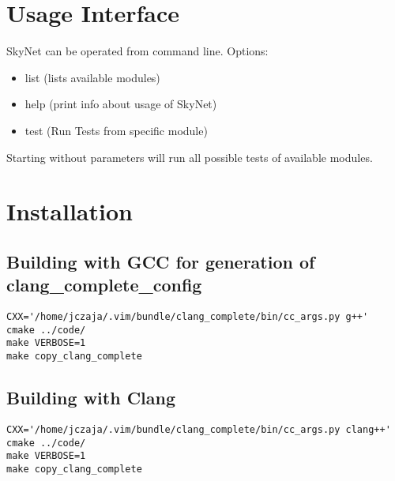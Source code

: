 \documentclass[a4paper,10pt]{article}
\begin{document}
\section{Usage Interface}
SkyNet can be operated from command line. Options:
\begin{itemize}
\item list (lists available modules)
\item help (print info about usage of SkyNet)
\item test (Run Tests from specific module)
\end{itemize}

Starting without parameters will run all possible tests of available modules.


\section{Installation}
\subsection{Building with GCC for generation of clang\_complete\_config}
\begin{verbatim}
CXX='/home/jczaja/.vim/bundle/clang_complete/bin/cc_args.py g++'   cmake ../code/
make VERBOSE=1
make copy_clang_complete
\end{verbatim}
\subsection{Building with Clang}
\begin{verbatim}
CXX='/home/jczaja/.vim/bundle/clang_complete/bin/cc_args.py clang++'   cmake ../code/
make VERBOSE=1
make copy_clang_complete
\end{verbatim}
\end{document}
